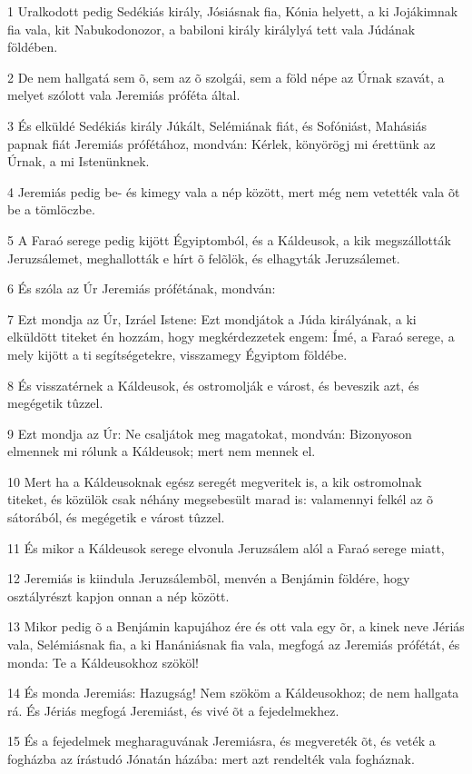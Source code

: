 \par 1 Uralkodott pedig Sedékiás király, Jósiásnak fia, Kónia helyett, a ki Jojákimnak fia vala, kit Nabukodonozor, a babiloni király királylyá tett vala Júdának földében.
\par 2 De nem hallgatá sem õ, sem az õ szolgái, sem a föld népe az Úrnak szavát, a melyet szólott vala Jeremiás próféta által.
\par 3 És elküldé Sedékiás király Júkált, Selémiának fiát, és Sofóniást, Mahásiás papnak fiát Jeremiás prófétához, mondván: Kérlek, könyörögj mi érettünk az Úrnak, a mi Istenünknek.
\par 4 Jeremiás pedig be- és kimegy vala a nép között, mert még nem vetették vala õt be a tömlöczbe.
\par 5 A Faraó serege pedig kijött Égyiptomból, és a Káldeusok, a kik megszállották Jeruzsálemet, meghallották e hírt õ felõlök, és elhagyták Jeruzsálemet.
\par 6 És szóla az Úr Jeremiás prófétának, mondván:
\par 7 Ezt mondja az Úr, Izráel Istene: Ezt mondjátok a Júda királyának, a ki elküldött titeket én hozzám, hogy megkérdezzetek engem: Ímé, a Faraó serege, a mely kijött a ti segítségetekre, visszamegy Égyiptom földébe.
\par 8 És visszatérnek a Káldeusok, és ostromolják e várost, és beveszik azt, és megégetik tûzzel.
\par 9 Ezt mondja az Úr: Ne csaljátok meg magatokat, mondván: Bizonyoson elmennek mi rólunk a Káldeusok; mert nem mennek el.
\par 10 Mert ha a Káldeusoknak egész seregét megveritek is, a kik ostromolnak titeket, és közülök csak néhány megsebesült marad is: valamennyi felkél az õ sátorából, és megégetik e várost tûzzel.
\par 11 És mikor a Káldeusok serege elvonula Jeruzsálem alól a Faraó serege miatt,
\par 12 Jeremiás is kiindula Jeruzsálembõl, menvén a Benjámin földére, hogy osztályrészt kapjon onnan a nép között.
\par 13 Mikor pedig õ a Benjámin kapujához ére és ott vala egy õr, a kinek neve Jériás vala, Selémiásnak fia, a ki Hanániásnak fia vala, megfogá az Jeremiás prófétát, és monda: Te a Káldeusokhoz szököl!
\par 14 És monda Jeremiás: Hazugság! Nem szököm a Káldeusokhoz; de nem hallgata rá. És Jériás megfogá Jeremiást, és vivé õt a fejedelmekhez.
\par 15 És a fejedelmek megharaguvának Jeremiásra, és megvereték õt, és veték a fogházba az írástudó Jónatán házába: mert azt rendelték vala fogháznak.
